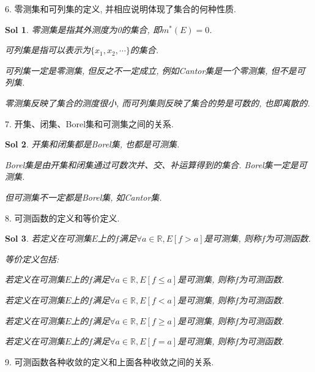 \documentclass[UTF8]{article}
\newtheorem{solution}{Sol}
\begin{document}
    6. 零测集和可列集的定义, 并相应说明体现了集合的何种性质.\par
    \begin{solution}
        零测集是指其外测度为0的集合, 即$m^{*}(E)=0$.\par
        可列集是指可以表示为$\{x_1, x_2, \cdots\}$的集合.\par
        可列集一定是零测集, 但反之不一定成立, 例如Cantor集是一个零测集, 但不是可列集.\par
        零测集反映了集合的测度很小, 而可列集则反映了集合的势是可数的, 也即离散的.\par
    \end{solution}
    7. 开集、闭集、Borel集和可测集之间的关系.\par
    \begin{solution}
        开集和闭集都是Borel集, 也都是可测集.\par
        Borel集是由开集和闭集通过可数次并、交、补运算得到的集合. Borel集一定是可测集.\par
        但可测集不一定都是Borel集, 如Cantor集.\par
    \end{solution}
    8. 可测函数的定义和等价定义.\par
    \begin{solution}
        若定义在可测集$E$上的$f$满足$\forall a\in \mathbb{R}, E[f>a]$是可测集, 则称$f$为可测函数.\par
        等价定义包括:\par
        若定义在可测集$E$上的$f$满足$\forall a\in \mathbb{R}, E[f\leqslant a]$是可测集, 则称$f$为可测函数.\par
        若定义在可测集$E$上的$f$满足$\forall a\in \mathbb{R}, E[f< a]$是可测集, 则称$f$为可测函数.\par
        若定义在可测集$E$上的$f$满足$\forall a\in \mathbb{R}, E[f\geqslant a]$是可测集, 则称$f$为可测函数.\par
        若定义在可测集$E$上的$f$满足$\forall a\in \mathbb{R}, E[f= a]$是可测集, 则称$f$为可测函数.\par
    \end{solution}
    9. 可测函数各种收敛的定义和上面各种收敛之间的关系.\par
\end{document}
